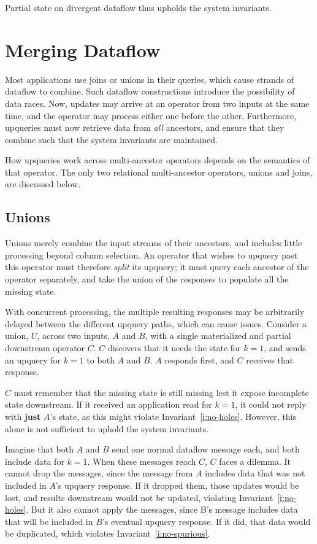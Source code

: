 Partial state on divergent dataflow thus upholds the system invariants.

\section{Merging Dataflow}
\label{s:partial:merging}

Most applications use joins or unions in their queries, which cause strands of
dataflow to combine. Such dataflow constructions introduce the possibility of
data races. Now, updates may arrive at an operator from two inputs at the same
time, and the operator may process either one before the other. Furthermore,
upqueries must now retrieve data from \emph{all} ancestors, and ensure that they
combine such that the system invariants are maintained.

How upqueries work across multi-ancestor operators depends on the semantics of
that operator. The only two relational multi-ancestor operators, unions and
joins, are discussed below.

\subsection{Unions}
\label{s:upqueries:union}

Unions merely combine the input streams of their ancestors, and includes little
processing beyond column selection. An operator that wishes to upquery past this
operator must therefore \emph{split} its upquery; it must query each ancestor of
the operator separately, and take the union of the responses to populate all the
missing state.

With concurrent processing, the multiple resulting responses may be arbitrarily
delayed between the different upquery paths, which can cause issues. Consider a
union, $U$, across two inputs, $A$ and $B$, with a single materialized and
partial downstream operator $C$. $C$ discovers that it needs the state for $k =
1$, and sends an upquery for $k = 1$ to both $A$ and $B$. $A$ responds first,
and $C$ receives that response.

$C$ must remember that the missing state is still missing lest it expose
incomplete state downstream. If it received an application read for $k = 1$, it
could not reply with \textbf{just} $A$'s state, as this might violate
Invariant~\ref{i:no-holes}. However, this alone is not sufficient to uphold the
system invariants.

Imagine that both $A$ and $B$ send one normal dataflow message each, and both
include data for $k = 1$. When these messages reach $C$, $C$ faces a dilemma. It
cannot drop the messages, since the message from $A$ includes data that was not
included in $A$'s upquery response. If it dropped them, those updates would be
lost, and results downstream would not be updated, violating
Invariant~\ref{i:no-holes}. But it also cannot apply the messages, since B's
message includes data that will be included in $B$'s eventual upquery response.
If it did, that data would be duplicated, which violates
Invariant~\ref{i:no-spurious}.

